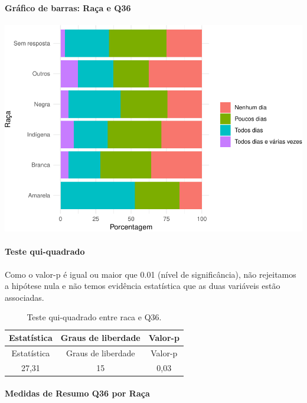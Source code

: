 \documentclass[]{article}
\let\oldparagraph\paragraph
\renewcommand{\paragraph}[1]{\oldparagraph{#1}\mbox{}}
\begin{document}
\hypertarget{gruxe1fico-de-barras-rauxe7a-e-q36}{%
\paragraph{Gráfico de barras: Raça e Q36}\label{gruxe1fico-de-barras-rauxe7a-e-q36}}

\begin{center}\includegraphics[width=0.75\linewidth]{relatorio_covid19_files/figure-latex/unnamed-chunk-1341-1} \end{center}

\hypertarget{teste-qui-quadrado-115}{%
\paragraph{Teste qui-quadrado}\label{teste-qui-quadrado-115}}

Como o valor-p é igual ou maior que 0.01 (nível de significância), não rejeitamos a hipótese nula e não temos evidência estatística que as duas variáveis estão associadas.

\begin{longtable}[]{@{}ccc@{}}
\caption{\label{tab:unnamed-chunk-1343}Teste qui-quadrado entre raca e Q36.}\tabularnewline
\toprule
Estatística & Graus de liberdade & Valor-p\tabularnewline
\midrule
\endfirsthead
\toprule
Estatística & Graus de liberdade & Valor-p\tabularnewline
\midrule
\endhead
27,31 & 15 & 0,03\tabularnewline
\bottomrule
\end{longtable}

\cleardoublepage

\hypertarget{medidas-de-resumo-q36-por-rauxe7a}{%
\paragraph{Medidas de Resumo Q36 por Raça}\label{medidas-de-resumo-q36-por-rauxe7a}}
\end{document}

